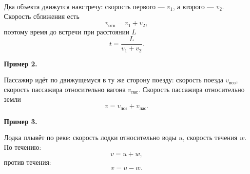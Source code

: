 \documentclass[12 pt, a4paper]{article}%
\begin{document}
Два объекта движутся навстречу: скорость первого --- $v_1$, а второго --- $v_2$. Скорость сближения есть  
\[
v_{\mathrm{отн}} = v_1 + v_2,
\]  
поэтому время до встречи при расстоянии $L$  
\[
t = \frac{L}{v_1 + v_2}.
\]

\textbf{Пример 2.}

Пассажир идёт по движущемуся в ту же сторону поезду: скорость поезда $v_{\mathrm{поз}}$, скорость пассажира относительно вагона $v_{\mathrm{пас}}$. Скорость пассажира относительно земли  
\[
v = v_{\mathrm{поз}} + v_{\mathrm{пас}}.
\]

\textbf{Пример 3.}

Лодка плывёт по реке: скорость лодки относительно воды $u$, скорость течения $w$.  
По течению:
\[
v = u + w,
\]
против течения:
\[
v = u - w.
\]
\end{document}
